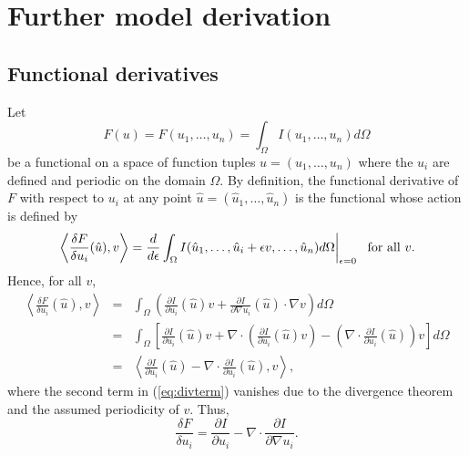 \chapter{Further model derivation}
\label{sec:appendix}

\section{Functional derivatives}
\label{sec:fderiv}

Let
%
\begin{equation}
  F(u) = F(u_1, \ldots, u_n) = \int_{\Omega} I(u_1, \ldots, u_n) d\Omega
\end{equation}
%
be a functional on a space of function tuples $u = (u_1,\ldots,u_n)$
where the $u_i$ are defined and periodic on the domain
$\Omega$.  By definition, the functional derivative of $F$ with
respect to $u_i$ at any point $\hat{u} = (\hat{u}_1,\ldots,\hat{u}_n)$
is the functional whose action is defined by
%
\begin{equation}
  \left .  \left < \frac{\delta F}{\delta
      u_i}(\hat{u}), v \right >
  = \frac{d}{d \epsilon} \int_{\Omega} I(\hat{u}_1, \ldots, \hat{u}_i + \epsilon
  v, \ldots, \hat{u}_n) d\Omega \right |_{\epsilon=0} ~~{\rm for~all~}v.
\end{equation}
%
Hence, for all $v$,
%
\begin{eqnarray}
  \left < \frac{\delta F}{\delta
      u_i}(\hat{u}), v \right >
  &=& \int_{\Omega} \left ( \frac{\partial I}{\partial u_i}(\hat{u})v + \frac{\partial
    I}{\partial \nabla u_i}(\hat{u}) \cdot \nabla v \right ) d\Omega
      \\
  &=& \int_{\Omega} \left [ \frac{\partial I}{\partial u_i}(\hat{u})v +
      \nabla \cdot \left ( \frac{\partial
    I}{\partial u_i}(\hat{u}) v \right ) 
  - \left ( \nabla \cdot \frac{\partial
    I}{\partial u_i}(\hat{u}) \right ) v
  \right ] d\Omega \label{eq:divterm} \\
  &=& \left < \frac{\partial I}{\partial u_i}(\hat{u})
  - \nabla \cdot \frac{\partial
    I}{\partial u_i}(\hat{u}) , v
  \right > ,
\end{eqnarray}
%
where the second term in (\ref{eq:divterm}) vanishes due to the
divergence theorem and the assumed periodicity of $v$.
Thus,
%
\begin{equation}
  \frac{\delta F}{\delta u_i} = \frac{\partial I}{\partial u_i}
  - \nabla \cdot \frac{\partial
    I}{\partial \nabla u_i} .  \label{funcderiv}
\end{equation}

